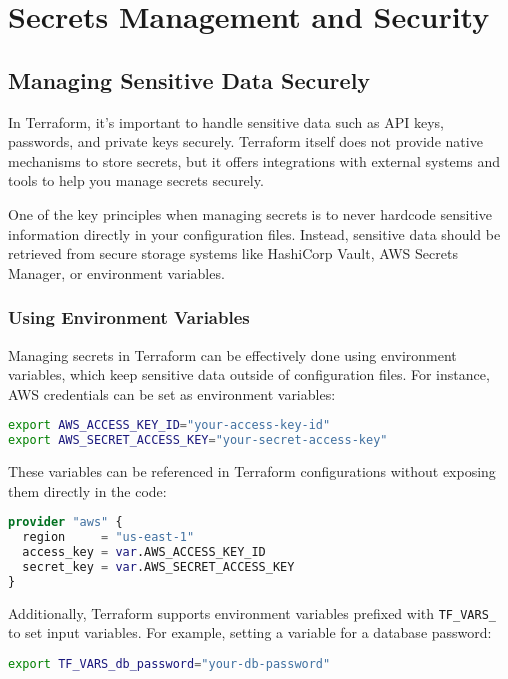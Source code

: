 \chapter{Secrets Management and Security}
\sloppy

\section{Managing Sensitive Data Securely}

In Terraform, it's important to handle sensitive data such as API keys, passwords, and private keys securely. Terraform itself does not provide native mechanisms to store secrets, but it offers integrations with external systems and tools to help you manage secrets securely.

One of the key principles when managing secrets is to never hardcode sensitive information directly in your configuration files. Instead, sensitive data should be retrieved from secure storage systems like HashiCorp Vault, AWS Secrets Manager, or environment variables.

\subsection{Using Environment Variables}

Managing secrets in Terraform can be effectively done using environment variables, which keep sensitive data outside of configuration files. For instance, AWS credentials can be set as environment variables:

\begin{lstlisting}[language=bash]
export AWS_ACCESS_KEY_ID="your-access-key-id"
export AWS_SECRET_ACCESS_KEY="your-secret-access-key"
\end{lstlisting}

These variables can be referenced in Terraform configurations without exposing them directly in the code:

\begin{lstlisting}[language=terraform]
provider "aws" {
  region     = "us-east-1"
  access_key = var.AWS_ACCESS_KEY_ID
  secret_key = var.AWS_SECRET_ACCESS_KEY
}
\end{lstlisting}

Additionally, Terraform supports environment variables prefixed with \texttt{TF\_VARS\_} to set input variables. For example, setting a variable for a database password:

\begin{lstlisting}[language=bash]
export TF_VARS_db_password="your-db-password"
\end{lstlisting}

